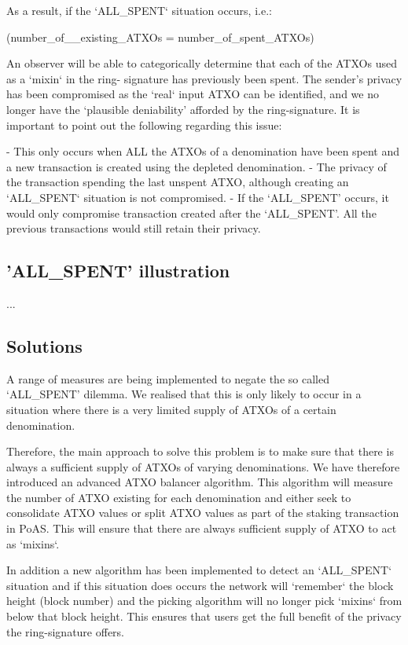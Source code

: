  

As a result, if the ‘ALL\_SPENT‘ situation occurs, i.e.: 

 

(number\_of\_\_existing\_ATXOs = number\_of\_spent\_ATXOs) 

 

An observer will be able to categorically determine that each of the ATXOs used as a ‘mixin‘ in the ring-
signature has previously been spent. The sender’s privacy has been compromised as the ‘real‘ input ATXO 
can be identified, and we no longer have the ‘plausible deniability’ afforded by the ring-signature. It is 
important to point out the following regarding this issue: 

 

- This only occurs when ALL the ATXOs of a denomination have been spent and a new transaction is created 
using the depleted denomination. 
- The privacy of the transaction spending the last unspent ATXO, although creating an ‘ALL\_SPENT‘ situation 
is not compromised. 
- If the ‘ALL\_SPENT’ occurs, it would only compromise transaction created after the ‘ALL\_SPENT’. All the 
previous transactions would still retain their privacy. 


\subsection{'ALL\_SPENT' illustration}

...

\subsection{Solutions}
A range of measures are being implemented to negate the so called ‘ALL\_SPENT’ dilemma. We realised 
that this is only likely to occur in a situation where there is a very limited supply of ATXOs of a certain 
denomination. 

Therefore, the main approach to solve this problem is to make sure that there is always a sufficient supply 
of ATXOs of varying denominations. We have therefore introduced an advanced ATXO balancer algorithm. 
This algorithm will measure the number of ATXO existing for each denomination and either seek to 
consolidate ATXO values or split ATXO values as part of the staking transaction in PoAS. This will ensure 
that there are always sufficient supply of ATXO to act as ‘mixins‘. 



In addition a new algorithm has been implemented to detect an ‘ALL\_SPENT‘ situation and if this situation 
does occurs the network will ‘remember‘ the block height (block number) and the picking algorithm will no 
longer pick ‘mixins‘ from below that block height. This ensures that users get the full benefit of the privacy 
the ring-signature offers. 
